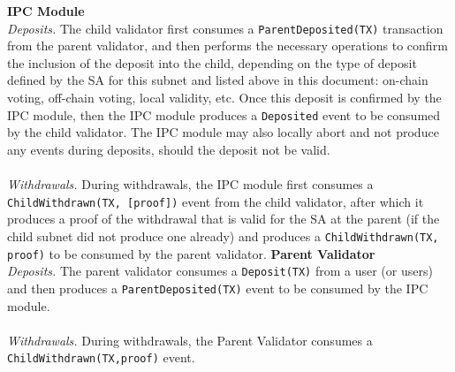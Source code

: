 \noindent\textbf{IPC Module}\\
\textit{Deposits.} The child validator first consumes a \texttt{ParentDeposited(TX)} transaction from the parent validator, and then performs the necessary operations to confirm the inclusion of the deposit into the child, depending on the type of deposit defined by the SA for this subnet and listed above in this document: on-chain voting, off-chain voting, local validity, etc. Once this deposit is confirmed by the IPC module, then the IPC module produces a \texttt{Deposited} event to be consumed by the child validator. The IPC module may also locally abort and not produce any events during deposits, should the deposit not be valid.\\~\\
\textit{Withdrawals.} During withdrawals, the IPC module first consumes a \texttt{ChildWithdrawn(TX, [proof])} event from the child validator, after which it produces a proof of the withdrawal that is valid for the SA at the parent (if the child subnet did not produce one already) and produces a \texttt{ChildWithdrawn(TX, proof)} to be consumed by the parent validator. 
\noindent\textbf{Parent Validator}\\
\textit{Deposits.} The parent validator consumes a \texttt{Deposit(TX)} from a user (or users) and then produces a \texttt{ParentDeposited(TX)} event to be consumed by the IPC module.
\\~\\
\textit{Withdrawals.} During withdrawals, the Parent Validator consumes a \texttt{ChildWithdrawn(TX,proof)} event. 
